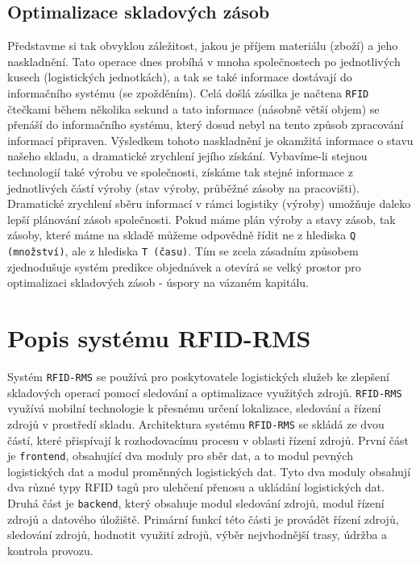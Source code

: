 \documentclass[czech,BP]{thesiskiv}
\begin{document}
\subsection{Optimalizace skladových zásob}
Představme si tak obvyklou záležitost, jakou je příjem materiálu (zboží) a jeho naskladnění. Tato operace dnes probíhá v mnoha společnostech po jednotlivých kusech (logistických jednotkách), a tak se také informace dostávají do informačního systému (se zpožděním).
Celá došlá zásilka je načtena \texttt{RFID} čtečkami během několika sekund a tato informace (násobně větší objem) se přenáší do informačního systému, který dosud nebyl na tento způsob zpracování informací připraven. Výsledkem tohoto naskladnění je okamžitá informace o stavu našeho skladu, a dramatické zrychlení jejího získání. Vybavíme-li stejnou technologií také výrobu ve společnosti, získáme tak stejné informace z jednotlivých částí výroby (stav výroby, průběžné zásoby na pracovišti). 
Dramatické zrychlení sběru informací v rámci logistiky (výroby) umožňuje daleko lepší plánování zásob společnosti. Pokud máme plán výroby a stavy zásob, tak zásoby, které máme na skladě můžeme odpovědně řídit ne z hlediska \texttt{Q (množství)}, ale z hlediska 
\texttt{T (času)}. Tím se zcela zásadním způsobem zjednodušuje systém predikce objednávek a otevírá se velký prostor pro optimalizaci skladových zásob - úspory na vázaném kapitálu.\cite{dolevcek2010identifikace}

\section{Popis systému RFID-RMS}
Systém \texttt{RFID-RMS} se používá pro poskytovatele logistických služeb ke zlepšení skladových operací pomocí sledování a optimalizace využitých zdrojů. \texttt{RFID-RMS} využívá mobilní technologie k přesnému určení lokalizace, sledování a řízení zdrojů v prostředí skladu. Architektura systému \texttt{RFID-RMS} se skládá ze dvou částí, které přispívají k rozhodovacímu procesu v oblasti řízení zdrojů. První část je \texttt{frontend}, obsahující dva moduly pro sběr dat, a to modul pevných logistických dat a modul proměnných logistických dat. Tyto dva moduly obsahují dva různé typy RFID tagů pro ulehčení přenosu a ukládání logistických dat. Druhá část je \texttt{backend}, který obsahuje modul sledování zdrojů, modul řízení zdrojů a datového úložiště. Primární funkcí této části je provádět řízení zdrojů, sledování zdrojů, hodnotit využití zdrojů, výběr nejvhodnější trasy, údržba a kontrola provozu.\cite{chow2006design}
\end{document}
